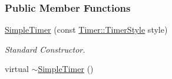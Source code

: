 \subsubsection*{Public Member Functions}
\begin{DoxyCompactItemize}
\item 
\hyperlink{classMezzanine_1_1SimpleTimer_a0487972b9181d90a38759449fc223452}{SimpleTimer} (const \hyperlink{classMezzanine_1_1Timer_a1db436d4e0d6f1676e41ba3cb2ea3aaa}{Timer::TimerStyle} style)
\begin{DoxyCompactList}\small\item\em Standard Constructor. \item\end{DoxyCompactList}\item 
\hypertarget{classMezzanine_1_1SimpleTimer_ae865561febcb6e7ef2dfc99f5af0571a}{
virtual \hyperlink{classMezzanine_1_1SimpleTimer_ae865561febcb6e7ef2dfc99f5af0571a}{$\sim$SimpleTimer} ()}
\label{classMezzanine_1_1SimpleTimer_ae865561febcb6e7ef2dfc99f5af0571a}


\end{DoxyCompactItemize}
